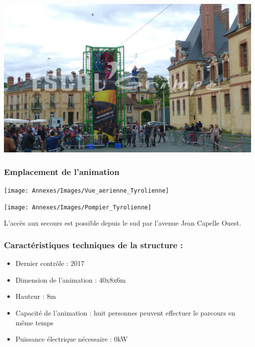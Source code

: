 \documentclass[hidelinks, paper=a4, fontsize=13pt]{report}
\begin{document}
\begin{center}
\includegraphics[scale=0.4,keepaspectratio]{Annexes/Images/tyrolienne}

\end{center}

\subsubsection{Emplacement de l’animation}

\begin{center}
\texttt{[image: Annexes/Images/Vue\_aerienne\_Tyrolienne]}
\end{center}

\begin{center}
\texttt{[image: Annexes/Images/Pompier\_Tyrolienne]}
\end{center}

L’accès aux secours est possible depuis le sud par l’avenue Jean Capelle Ouest. 


\subsubsection{Caractéristiques techniques de la structure :}
\begin{itemize}
\item Dernier contrôle : 2017
\item Dimension de l’animation : 40x8x6m
\item Hauteur : 8m
\item Capacité de l’animation : huit personnes peuvent effectuer le parcours en même temps
\item Puissance électrique nécessaire : 0kW
\end{itemize}
\end{document}
